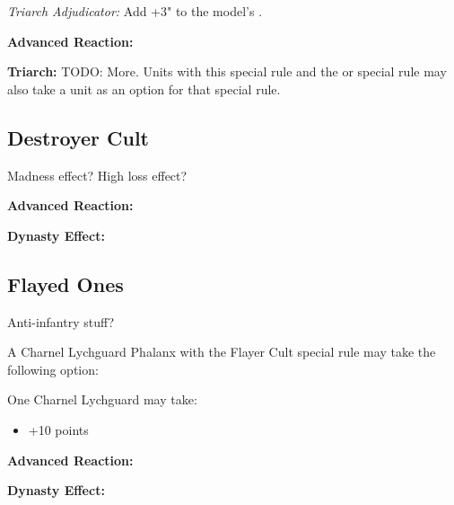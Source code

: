 \textit{Triarch Adjudicator:} Add +3" to the model's .

\textbf{Advanced Reaction:}

\textbf{Triarch:} TODO: More. Units with this special rule and the  or  special rule may also take a  unit as an option for that special rule.


\subsection{Destroyer Cult}

Madness effect? High loss effect?

\textbf{Advanced Reaction:}

\textbf{Dynasty Effect:}


\subsection{Flayed Ones}

Anti-infantry stuff?

A Charnel Lychguard Phalanx with the Flayer Cult special rule may take the following option:

One Charnel Lychguard may take:
\begin{itemize}
	\item {} \dotfill +10 points
\end{itemize} 

\textbf{Advanced Reaction:}

\textbf{Dynasty Effect:}